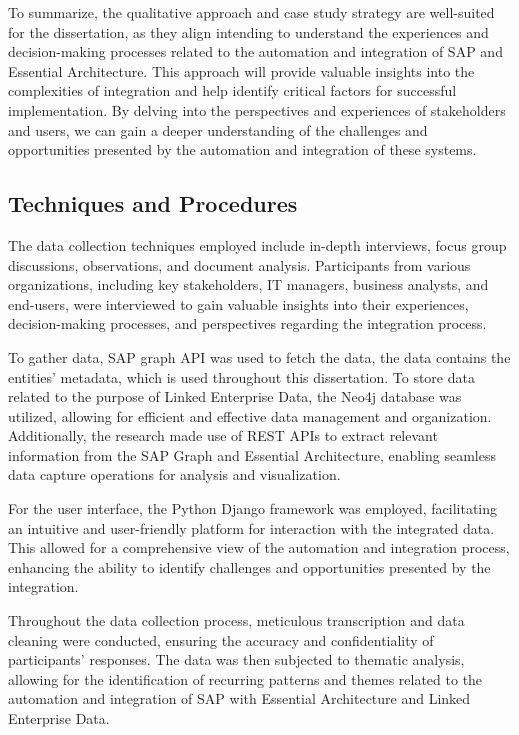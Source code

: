 \documentclass{article}
\begin{document}
To summarize, the qualitative approach and case study strategy are well-suited for the dissertation, as they align intending to understand the experiences and decision-making processes related to the automation and integration of SAP and Essential Architecture. This approach will provide valuable insights into the complexities of integration and help identify critical factors for successful implementation. By delving into the perspectives and experiences of stakeholders and users, we can gain a deeper understanding of the challenges and opportunities presented by the automation and integration of these systems.

\maketitle
\subsection{Techniques and Procedures}
The data collection techniques employed include in-depth interviews, focus group discussions, observations, and document analysis. Participants from various organizations, including key stakeholders, IT managers, business analysts, and end-users, were interviewed to gain valuable insights into their experiences, decision-making processes, and perspectives regarding the integration process.

To gather data, SAP graph API was used to fetch the data, the data contains the entities' metadata, which is used throughout this dissertation. To store data related to the purpose of Linked Enterprise Data, the Neo4j database was utilized, allowing for efficient and effective data management and organization. Additionally, the research made use of REST APIs to extract relevant information from the SAP Graph and Essential Architecture, enabling seamless data capture operations for analysis and visualization.

For the user interface, the Python Django framework was employed, facilitating an intuitive and user-friendly platform for interaction with the integrated data. This allowed for a comprehensive view of the automation and integration process, enhancing the ability to identify challenges and opportunities presented by the integration.

Throughout the data collection process, meticulous transcription and data cleaning were conducted, ensuring the accuracy and confidentiality of participants' responses. The data was then subjected to thematic analysis, allowing for the identification of recurring patterns and themes related to the automation and integration of SAP with Essential Architecture and Linked Enterprise Data.
\end{document}
